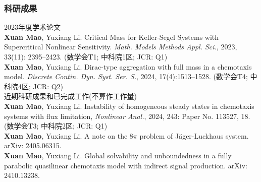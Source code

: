 \documentclass[10pt,xcolor=dvipsnames]{beamer}
\theoremstyle{remark}
\theoremstyle{definition}
\begin{document}
\begin{frame}[allowframebreaks]
\frametitle{科研成果}
2023年度学术论文\\
\textbf{Xuan Mao}, Yuxiang Li.
Critical Mass for Keller-Segel Systems with Supercritical Nonlinear Sensitivity. 
\emph{Math. Models Methods Appl. Sci.}, 2023, 33(11): 2395--2423.
\hfill (数学会T1; 中科院1区; JCR: Q1)\\
\textbf{Xuan Mao}, Yuxiang Li. 
Dirac-type aggregation with full mass in a chemotaxis model. 
\emph{Discrete Contin. Dyn. Syst. Ser. S.}, 2024, 17(4):1513--1528. 
\hfill (数学会T4; 中科院4区; JCR: Q2)\\
近期科研成果和已完成工作(不算作工作量)\\
\textbf{Xuan Mao}, Yuxiang Li. 
Instability of homogeneous steady states in chemotaxis systems with flux limitation, 
\emph{Nonlinear Anal.}, 2024, 243: Paper No. 113527, 18.
\hfill (数学会T3; 中科院2区; JCR: Q1)\\
\textbf{Xuan Mao}, Yuxiang Li. 
A note on the $8\pi$ problem of J\"ager-Luckhaus system.
{arXiv: 2405.06315}.\\ 
\textbf{Xuan Mao}, Yuxiang Li.
Global solvability and unboundedness in a fully parabolic quasilinear chemotaxis model with indirect signal production.
{arXiv: 2410.13238}.

\end{frame}
\end{document}
